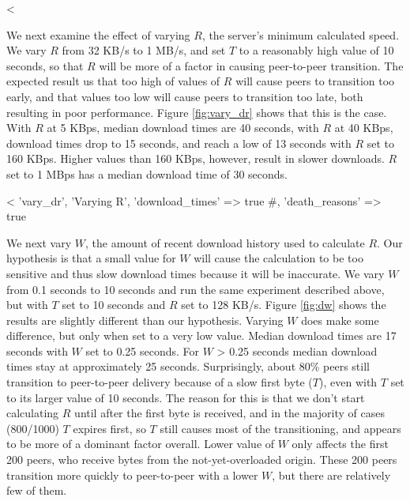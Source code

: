 <%

We next examine the effect of varying $R$, the server's minimum calculated speed.  We vary $R$ from 32 KB/s to 1 MB/s, and set $T$ to a 
reasonably high value of 10 seconds, so that $R$ will be more of a factor in causing peer-to-peer transition. 
The expected result us that too high of values of $R$ will cause peers to transition 
too early, and that values too low will cause peers to transition too late, both resulting in poor performance. Figure \ref{fig:vary_dr} shows that this is the case.
With $R$ at 5 KBps, median download times are 40 seconds, with $R$ at 40 KBps, download times drop to 15 seconds, and reach
a low of 13 seconds with $R$ set to 160 KBps. Higher values than 160 KBps, however, result in slower downloads.  $R$ set to 1 MBps has a median download time of 30 seconds. 

<%
  'vary_dr', 'Varying R', 'download_times' => true #, 'death_reasons' => true 

We next vary $W$, the amount of recent download history used to calculate $R$. Our hypothesis is that 
a small value for $W$ will cause the calculation to be too sensitive and thus slow download times because it will be inaccurate. 
We vary $W$ from 0.1 seconds 
to 10 seconds and run the same experiment described above, but with $T$ set to 10 seconds and $R$ set to 128 KB/s. Figure \ref{fig:dw} shows the results are 
slightly different than our hypothesis. Varying $W$ does make some difference, but only when set 
to a very low value. Median download times are 17 seconds with $W$ set to 0.25 seconds. For $W$ \textgreater{} 0.25 seconds
median download times stay at approximately 25 seconds. Surprisingly, 
about 80\% peers still transition to peer-to-peer delivery because of 
a slow first byte ($T$), even with $T$ set to its larger value of 10 seconds. 
The reason for this is that we don't start calculating $R$ until after the first byte is received, and 
in the majority of cases (800/1000) $T$ expires first, so $T$ still 
causes most of the transitioning, and appears to be more of a dominant factor overall.  Lower value of $W$ only affects the first 
200 peers, who receive bytes from the not-yet-overloaded origin.  
These 200 peers transition more quickly to peer-to-peer with a lower $W$, but there are relatively few of them.

